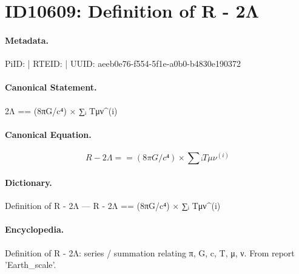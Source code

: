 \section*{ID10609: Definition of R - 2Λ}
\paragraph{Metadata.}
PiID:  | RTEID:  | UUID: aeeb0e76-f554-5f1e-a0b0-b4830e190372

\paragraph{Canonical Statement.}
2Λ == (8πG/c⁴) × ∑ᵢ Tμν\textasciicircum{}(i)

\paragraph{Canonical Equation.}
\[
R - 2Λ == (8πG/c⁴) × ∑ᵢ Tμν^(i)
\]

\paragraph{Dictionary.}
Definition of R - 2Λ — R - 2Λ == (8πG/c⁴) × ∑ᵢ Tμν\textasciicircum{}(i)

\paragraph{Encyclopedia.}
Definition of R - 2Λ: series / summation relating π, G, c, T, μ, ν. From report 'Earth\_scale'.
